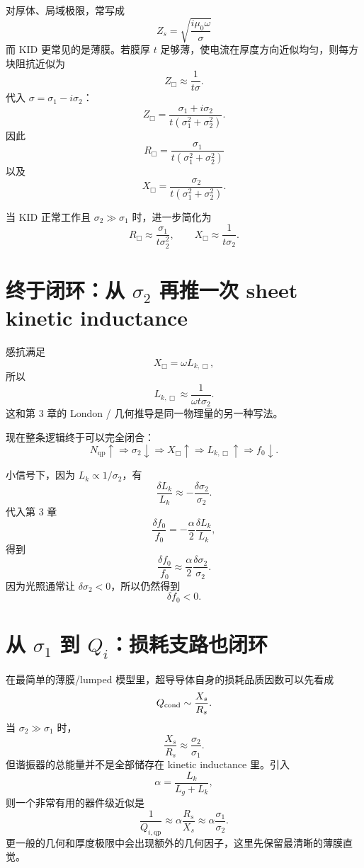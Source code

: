 \documentclass[11pt,a4paper,openany]{ctexrep}
\newcommand{\qp}{\mathrm{qp}}
\begin{document}
对厚体、局域极限，常写成
\[
\boxed{
Z_s=\sqrt{\frac{i\mu_0\omega}{\sigma}}
}
\]
而 KID 更常见的是薄膜。若膜厚 $t$ 足够薄，使电流在厚度方向近似均匀，则每方块阻抗近似为
\[
\boxed{
Z_{\Box}
\approx
\frac{1}{t\sigma}.
}
\]
代入 $\sigma=\sigma_1-i\sigma_2$：
\[
Z_{\Box}
=
\frac{\sigma_1+i\sigma_2}
{t(\sigma_1^2+\sigma_2^2)}.
\]
因此
\[
\boxed{
R_{\Box}
=
\frac{\sigma_1}
{t(\sigma_1^2+\sigma_2^2)}
}
\]
以及
\[
\boxed{
X_{\Box}
=
\frac{\sigma_2}
{t(\sigma_1^2+\sigma_2^2)}.
}
\]

当 KID 正常工作且 $\sigma_2\gg\sigma_1$ 时，进一步简化为
\[
\boxed{
R_{\Box}\approx\frac{\sigma_1}{t\sigma_2^2},
\qquad
X_{\Box}\approx\frac{1}{t\sigma_2}.
}
\]

\section{终于闭环：从 $\sigma_2$ 再推一次 sheet kinetic inductance}

感抗满足
\[
X_{\Box}=\omega L_{k,\Box},
\]
所以
\[
\boxed{
L_{k,\Box}
\approx
\frac{1}{\omega t\sigma_2}.
}
\]
这和第 3 章的 London / 几何推导是同一物理量的另一种写法。

现在整条逻辑终于可以完全闭合：
\[
N_{\qp}\uparrow
\Rightarrow
\sigma_2\downarrow
\Rightarrow
X_{\Box}\uparrow
\Rightarrow
L_{k,\Box}\uparrow
\Rightarrow
f_0\downarrow.
\]

小信号下，因为 $L_k\propto1/\sigma_2$，有
\[
\frac{\delta L_k}{L_k}
\approx
-\frac{\delta\sigma_2}{\sigma_2}.
\]
代入第 3 章
\[
\frac{\delta f_0}{f_0}
=-\frac{\alpha}{2}\frac{\delta L_k}{L_k},
\]
得到
\[
\boxed{
\frac{\delta f_0}{f_0}
\approx
\frac{\alpha}{2}
\frac{\delta\sigma_2}{\sigma_2}.
}
\]
因为光照通常让 $\delta\sigma_2<0$，所以仍然得到
\[
\boxed{\delta f_0<0.}
\]

\section{从 $\sigma_1$ 到 $Q_i$：损耗支路也闭环}

在最简单的薄膜/lumped 模型里，超导导体自身的损耗品质因数可以先看成
\[
Q_{\rm cond}
\sim
\frac{X_s}{R_s}.
\]
当 $\sigma_2\gg\sigma_1$ 时，
\[
\frac{X_s}{R_s}
\approx
\frac{\sigma_2}{\sigma_1}.
\]
但谐振器的总能量并不是全部储存在 kinetic inductance 里。引入
\[
\alpha=\frac{L_k}{L_g+L_k},
\]
则一个非常有用的器件级近似是
\[
\boxed{
\frac{1}{Q_{i,\qp}}
\approx
\alpha\frac{R_s}{X_s}
\approx
\alpha\frac{\sigma_1}{\sigma_2}.
}
\]
更一般的几何和厚度极限中会出现额外的几何因子，这里先保留最清晰的薄膜直觉。
\end{document}
